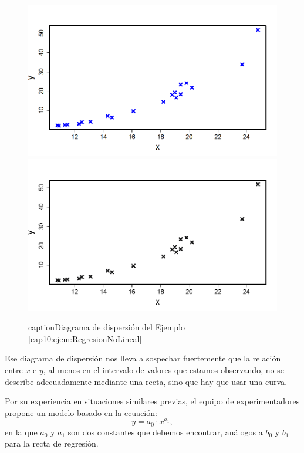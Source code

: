 \begin{ejemplo}
\begin{figure}[htb]
\begin{center}
\begin{enColor}
\includegraphics[width=14cm]{../fig/Cap10-EjemploRegresionNoLineal01.png}
\end{enColor}
\begin{bn}
\includegraphics[width=14cm]{../fig/Cap10-EjemploRegresionNoLineal01-bn.png}
\end{bn}
\end{center}
caption{Diagrama de dispersión del Ejemplo \ref{cap10:ejem:RegresionNoLineal}}
\label{cap10:fig:EjemploRegresionNoLineal}
\end{figure}
Ese diagrama de dispersión nos lleva a sospechar fuertemente que la relación entre $x$ e $y$, al menos en el intervalo de valores que estamos observando, no se describe adecuadamente mediante una recta, sino que hay que usar una curva.

Por su experiencia en situaciones similares previas, el equipo de experimentadores propone un modelo basado en la ecuación:
\begin{equation}
\label{cap10:ecu:ModeloRegresionNoLineal}
    y=a_0\cdot x^{a_1},
\end{equation}
en la que $a_0$ y $a_1$ son dos constantes que debemos encontrar, análogos a $b_0$ y $b_1$ para la recta de regresión.


\end{ejemplo}
